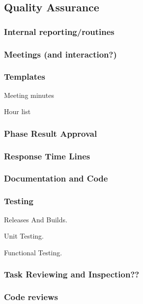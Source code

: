 \subsection{Quality Assurance}

\subsubsection{Internal reporting/routines}

\subsubsection{Meetings (and interaction?)}

\subsubsection{Templates}

Meeting minutes

Hour list


\subsubsection{Phase Result Approval}

\subsubsection{Response Time Lines}

\subsubsection{Documentation and Code}

\subsubsection{Testing}

Releases And Builds.

Unit Testing.

Functional Testing.

\subsubsection{Task Reviewing and Inspection??}

\subsubsection{Code reviews}

